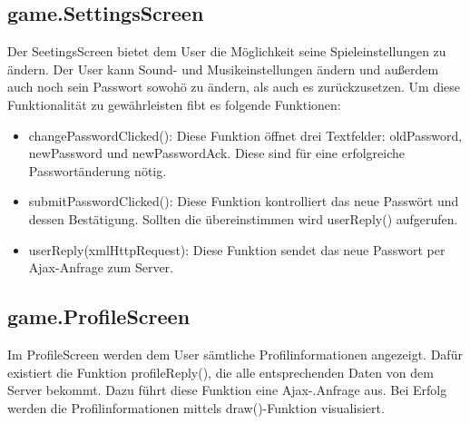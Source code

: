 \subsection{game.SettingsScreen}
\label{Settings}  
Der SeetingsScreen bietet dem User die M\"oglichkeit seine Spieleinstellungen zu \"andern. Der User kann Sound- und Musikeinstellungen \"andern und
au{\ss}erdem auch noch sein Passwort sowoh\"o zu \"andern, als auch es zur\"uckzusetzen. Um diese Funktionalit\"at zu gew\"ahrleisten fibt es folgende
Funktionen:
\begin{itemize}    
	\item changePasswordClicked(): Diese Funktion \"offnet drei Textfelder: oldPassword, newPassword und newPasswordAck. Diese sind f\"ur eine 
		 erfolgreiche Passwort\"anderung n\"otig.
	\item submitPasswordClicked(): Diese Funktion kontrolliert das neue Passw\"ort und dessen Best\"atigung. Sollten die \"ubereinstimmen wird userReply() 
		 aufgerufen.
	\item userReply(xmlHttpRequest): Diese Funktion sendet das neue Passwort per Ajax-Anfrage zum Server.
\end{itemize}    

\subsection{game.ProfileScreen}
\label{Profile}  
Im ProfileScreen werden dem User s\"amtliche Profilinformationen angezeigt. Daf\"ur existiert die Funktion profileReply(), die alle entsprechenden Daten
von dem Server bekommt. Dazu f\"uhrt diese Funktion eine Ajax-.Anfrage aus. Bei Erfolg werden die Profilinformationen mittels draw()-Funktion visualisiert.

\newpage
